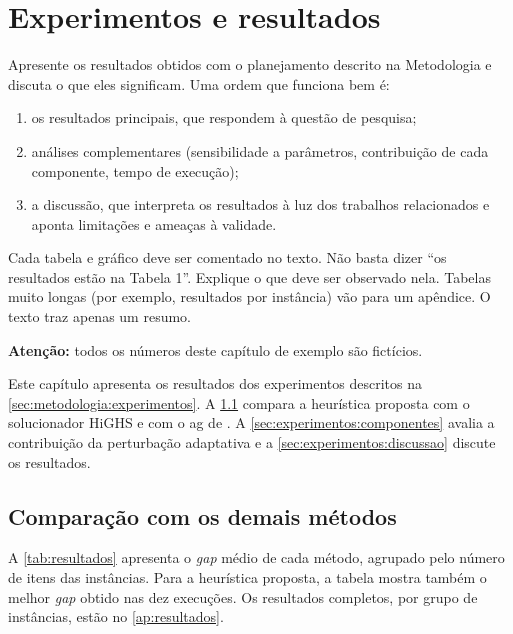 \chapter{Experimentos e resultados}
\label{cap:experimentos}

\begin{instrucao}
Apresente os resultados obtidos com o planejamento descrito na Metodologia e
discuta o que eles significam. Uma ordem que funciona bem é:
\begin{enumerate}
  \item os resultados principais, que respondem à questão de pesquisa;
  \item análises complementares (sensibilidade a parâmetros, contribuição de
        cada componente, tempo de execução);
  \item a discussão, que interpreta os resultados à luz dos trabalhos
        relacionados e aponta limitações e ameaças à validade.
\end{enumerate}
Cada tabela e gráfico deve ser comentado no texto. Não basta dizer ``os
resultados estão na Tabela 1''. Explique o que deve ser observado nela.
Tabelas muito longas (por exemplo, resultados por instância) vão para um
apêndice. O texto traz apenas um resumo.

\textbf{Atenção:} todos os números deste capítulo de exemplo são fictícios.
\end{instrucao}

Este capítulo apresenta os resultados dos experimentos descritos na
\cref{sec:metodologia:experimentos}. A \cref{sec:experimentos:comparacao}
compara a heurística proposta com o solucionador HiGHS e com o \acs{ag} de
\textcite{chu1998genetic}. A \cref{sec:experimentos:componentes} avalia a
contribuição da perturbação adaptativa e a \cref{sec:experimentos:discussao}
discute os resultados.

\section{Comparação com os demais métodos}
\label{sec:experimentos:comparacao}

A \cref{tab:resultados} apresenta o \emph{gap} médio de cada método, agrupado
pelo número de itens das instâncias. Para a heurística proposta, a tabela
mostra também o melhor \emph{gap} obtido nas dez execuções. Os resultados
completos, por grupo de instâncias, estão no \cref{ap:resultados}.

